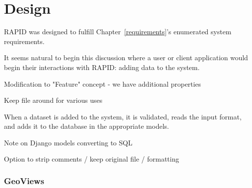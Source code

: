 \chapter{Design}
\label{design}

RAPID was designed to fulfill Chapter~\ref{requirements}'s enumerated system requirements.

It seems natural to begin this discussion where a user or client application would begin their interactions with RAPID: adding data to the system.



Modification to "Feature" concept - we have additional properties

Keep file around for various uses

When a dataset is added to the system, it is validated, reads the input format, and adds it to the database in the appropriate models.

Note on Django models converting to SQL

Option to strip comments / keep original file / formatting


\subsection{GeoViews}